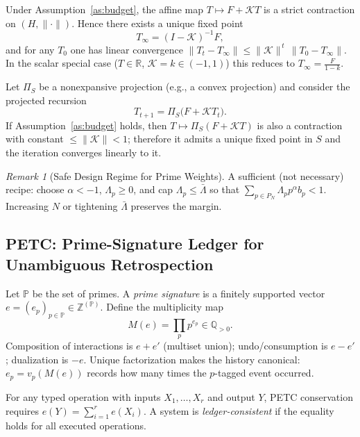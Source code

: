 \documentclass[11pt]{article}
\theoremstyle{definition}
\theoremstyle{remark}
\newtheorem{remark}[theorem]{Remark}
\newcommand{\1}{\mathbf{1}}
\begin{document}
\begin{theorem}
\label{thm:convergence}
Under Assumption~\ref{as:budget}, the affine map $T\mapsto F+\mathcal{K}T$ is a strict contraction on $(H,\|\cdot\|)$. Hence there exists a unique fixed point
\[
T_\infty=(I-\mathcal{K})^{-1}F,
\]
and for any $T_0$ one has linear convergence
$\|T_t-T_\infty\|\le \|\mathcal{K}\|^{\,t}\,\|T_0-T_\infty\|$.
In the scalar special case ($T\in\mathbb{R}$, $\mathcal{K}=k\in(-1,1)$) this reduces to $T_\infty=\frac{F}{1-k}$.
\end{theorem}

\begin{theorem}
\label{thm:uniqueness}
Let $\Pi_S$ be a nonexpansive projection (e.g., a convex projection) and consider the projected recursion
\[
T_{t+1}=\Pi_S\!\big(F+\mathcal{K}T_t\big).
\]
If Assumption~\ref{as:budget} holds, then $T\mapsto \Pi_S(F+\mathcal{K}T)$ is also a contraction with constant $\le\|\mathcal{K}\|<1$; therefore it admits a unique fixed point in $S$ and the iteration converges linearly to it.
\end{theorem}

\begin{remark}[Safe Design Regime for Prime Weights]
A sufficient (not necessary) recipe: choose $\alpha< -1$, $\Lambda_p\ge0$, and cap $\Lambda_p\le\bar\Lambda$ so that $\sum_{p\in P_N}\Lambda_p p^{\alpha} b_p<1$. Increasing $N$ or tightening $\bar\Lambda$ preserves the margin.
\end{remark}

\subsection{PETC: Prime-Signature Ledger for Unambiguous Retrospection}
Let $\mathbb{P}$ be the set of primes. A \emph{prime signature} is a finitely supported vector $e=(e_p)_{p\in\mathbb{P}}\in\mathbb{Z}^{(\mathbb{P})}$. Define the multiplicity map
\[
M(e)=\prod_{p} p^{e_p}\in\mathbb{Q}_{>0}.
\]
Composition of interactions is $e+e'$ (multiset union); undo/consumption is $e-e'$; dualization is $-e$.
Unique factorization makes the history canonical: $e_p=v_p(M(e))$ records how many times the $p$-tagged event occurred.

\begin{definition}
For any typed operation with inputs $X_1,\dots,X_r$ and output $Y$, PETC conservation requires
\(
e(Y)=\sum_{i=1}^r e(X_i).
\)
A system is \emph{ledger-consistent} if the equality holds for all executed operations.
\end{definition}
\end{document}
